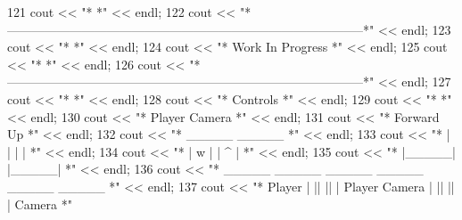 \begin{DoxyCode}
121         cout << \textcolor{stringliteral}{"*                                                                                      *"} 
      << endl;
122         cout << \textcolor{stringliteral}{"*--------------------------------------------------------------------------------------*"} 
      << endl;
123         cout << \textcolor{stringliteral}{"*                                                                                      *"} 
      << endl;
124         cout << \textcolor{stringliteral}{"*                                    Work In Progress                                  *"} 
      << endl;
125         cout << \textcolor{stringliteral}{"*                                                                                      *"} 
      << endl;
126         cout << \textcolor{stringliteral}{"*--------------------------------------------------------------------------------------*"} 
      << endl;
127         cout << \textcolor{stringliteral}{"*                                                                                      *"} 
      << endl;
128         cout << \textcolor{stringliteral}{"*                                       Controls                                       *"} 
      << endl;
129         cout << \textcolor{stringliteral}{"*                                                                                      *"} 
      << endl;
130         cout << \textcolor{stringliteral}{"*                 Player                                      Camera                   *"} 
      << endl;
131         cout << \textcolor{stringliteral}{"*                Forward                                        Up                     *"} 
      << endl;
132         cout << \textcolor{stringliteral}{"*                 \_\_\_\_\_                                        \_\_\_\_\_                   *"} 
      << endl;
133         cout << \textcolor{stringliteral}{"*                |     |                                      |     |                  *"} 
      << endl;
134         cout << \textcolor{stringliteral}{"*                |  w  |                                      |  ^  |                  *"} 
      << endl;
135         cout << \textcolor{stringliteral}{"*                |\_\_\_\_\_|                                      |\_\_\_\_\_|                  *"} 
      << endl;
136         cout << \textcolor{stringliteral}{"*          \_\_\_\_\_  \_\_\_\_\_  \_\_\_\_\_                          \_\_\_\_\_  \_\_\_\_\_  \_\_\_\_\_            *"} 
      << endl;
137         cout << \textcolor{stringliteral}{"*  Player |     ||     ||     | Player         Camera  |     ||     ||     | Camera    *"} 

\end{DoxyCode}
